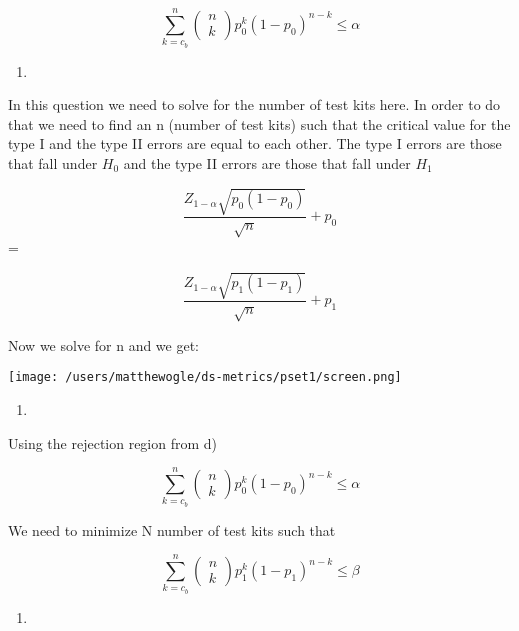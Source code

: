 \documentclass[
  12pt,
  landscape]{article}
\begin{document}
\[
\sum_{k = c_b}^{n}\begin{pmatrix} n \\ k \end{pmatrix}p_0^k
(1-p_0)^{n-k} \leq \alpha
\]

\begin{enumerate}
\def\labelenumi{(\alph{enumi})}
\setcounter{enumi}{4}
\item
\end{enumerate}

In this question we need to solve for the number of test kits here. In
order to do that we need to find an n (number of test kits) such that
the critical value for the type I and the type II errors are equal to
each other. The type I errors are those that fall under \(H_0\) and the
type II errors are those that fall under \(H_1\)

\[
\frac{Z_{1 - \alpha}\sqrt{p_0(1-p_0)}} {\sqrt{n}} + p_0 
\] =

\[
\frac{Z_{1 - \alpha}\sqrt{p_1(1-p_1)}} {\sqrt{n}} + p_1 
\]

Now we solve for n and we get:

\texttt{[image: /users/matthewogle/ds-metrics/pset1/screen.png]}

\begin{enumerate}
\def\labelenumi{(\alph{enumi})}
\setcounter{enumi}{5}
\item
\end{enumerate}

Using the rejection region from d)

\[
\sum_{k = c_b}^{n}\begin{pmatrix} n \\ k \end{pmatrix}p_0^k
(1-p_0)^{n-k} \leq \alpha
\]

We need to minimize N number of test kits such that

\[
\sum_{k = c_b}^{n}\begin{pmatrix} n \\ k \end{pmatrix}p_1^k
(1-p_1)^{n-k} \leq \beta
\]

\begin{enumerate}
\def\labelenumi{(\alph{enumi})}
\setcounter{enumi}{6}
\item
\end{enumerate}
\end{document}
